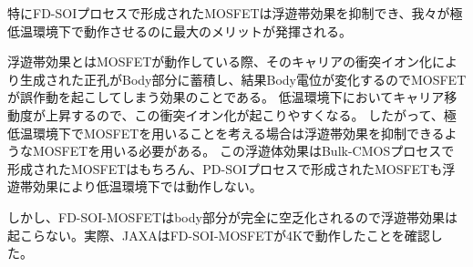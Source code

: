 		特にFD-SOIプロセスで形成されたMOSFETは浮遊帯効果を抑制でき、我々が極低温環境下で動作させるのに最大のメリットが発揮される。
		
		浮遊帯効果とはMOSFETが動作している際、そのキャリアの衝突イオン化により生成された正孔がBody部分に蓄積し、結果Body電位が変化するのでMOSFETが誤作動を起こしてしまう効果のことである。
		低温環境下においてキャリア移動度が上昇するので、この衝突イオン化が起こりやすくなる。
		したがって、極低温環境下でMOSFETを用いることを考える場合は浮遊帯効果を抑制できるようなMOSFETを用いる必要がある。
		この浮遊体効果はBulk-CMOSプロセスで形成されたMOSFETはもちろん、PD-SOIプロセスで形成されたMOSFETも浮遊帯効果により低温環境下では動作しない。
		
		しかし、FD-SOI-MOSFETはbody部分が完全に空乏化されるので浮遊帯効果は起こらない。実際、JAXAはFD-SOI-MOSFETが4Kで動作したことを確認した\cite{6}。
